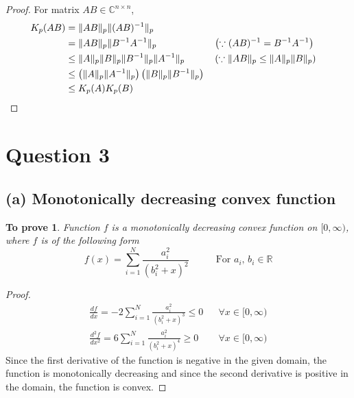 \documentclass[11pt, oneside]{article}
\newtheorem*{remark}{To prove}
\begin{document}
  	\begin{proof} For matrix $AB \in  \mathbb{C}^{n \times n}$,
    		\begin{align}
    			K_p(AB) &= \|AB\|_p \|(AB)^{-1}\|_p \\
					&= \|AB\|_p \|B^{-1}A^{-1}\|_p && \left(\because (AB)^{-1} = B^{-1} A^{-1}\right)\\
					&\leq \|A\|_p \|B\|_p  \|B^{-1}\|_p  \|A^{-1}\|_p && \left(\because \|AB\|_p \leq  \|A\|_p \|B\|_p\right)\\
					&\leq  \left(\|A\|_p \|A^{-1}\|_p \right) \left(\|B\|_p  \|B^{-1}\|_p\right) \\
					&\leq K_p(A) K_p(B) && \qedhere
    		\end{align}
  	\end{proof}
  
\section*{Question 3}
\subsection*{(a) Monotonically decreasing convex function}
  	\begin{remark}
    		Function $f$ is a monotonically decreasing convex function on $[0,\infty)$, where $f$ is of the following form
    		\begin{equation}
    			f(x) = \sum_{i=1}^{N} \frac{a_i^2}{(b_i^2 + x)^2} \mspace{50mu} \text{For } a_i,\,b_i \in \mathbb{R}  
    		\end{equation} 
 	\end{remark}

  	\begin{proof}
		\begin{align}
			\frac{df}{dx} = -2 \sum_{i=1}^{N} \frac{a_i^2}{(b_i^2 + x)^3}  \leq 0 && \forall x \in [0,\infty) \\
			\frac{d^2f}{dx^2} = 6 \sum_{i=1}^{N} \frac{a_i^2}{(b_i^2 + x)^4}  \geq 0 && \forall x \in [0,\infty)
		\end{align}
		Since the first derivative of the function is negative in the given domain, the function is monotonically decreasing and since the second derivative is positive in the domain, the function is convex.
  	\end{proof}
  
\end{document}
